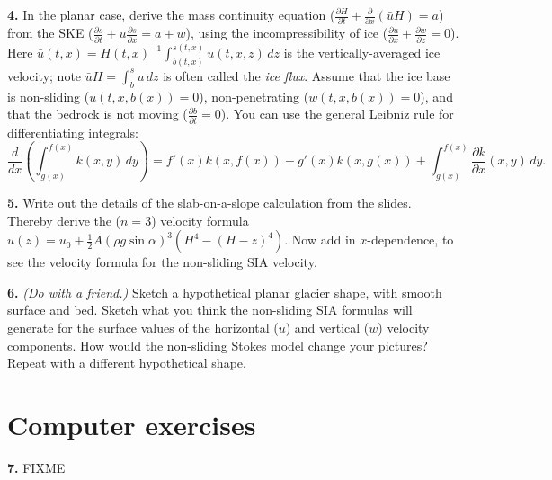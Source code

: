 \documentclass[12pt]{amsart}
\newcommand{\prob}[1]{\bigskip\noindent\textbf{#1.}\quad }
\begin{document}
\prob{4}  In the planar case, derive the mass continuity equation ($\frac{\partial H}{\partial t} + \frac{\partial}{\partial x}(\bar u H) = a$) from the SKE ($\frac{\partial s}{\partial t} + u \frac{\partial s}{\partial x} = a + w$), using the incompressibility of ice ($\frac{\partial u}{\partial x} + \frac{\partial w}{\partial z} = 0$).  Here $\bar u(t,x) = H(t,x)^{-1} \int_{b(t,x)}^{s(t,x)} u(t,x,z)\,dz$ is the vertically-averaged ice velocity; note $\bar u H = \int_b^s u\,dz$ is often called the \emph{ice flux}.  Assume that the ice base is non-sliding ($u(t,x,b(x))=0$), non-penetrating ($w(t,x,b(x))=0$), and that the bedrock is not moving ($\frac{\partial b}{\partial t} = 0$).  You can use the general Leibniz rule for differentiating integrals:
  $$\frac{d}{dx}\left(\int_{g(x)}^{f(x)} k(x,y)\,dy\right) = f'(x) k(x,f(x)) - g'(x) k(x,g(x)) + \int_{g(x)}^{f(x)} \frac{\partial k}{\partial x}(x,y)\,dy.$$

\prob{5}  Write out the details of the slab-on-a-slope calculation from the slides.  Thereby derive the ($n=3$) velocity formula $u(z) = u_0 + \frac{1}{2} A (\rho g \sin\alpha)^3  \left(H^4 - (H-z)^4\right)$.  Now add in $x$-dependence, to see the velocity formula for the non-sliding SIA velocity.

\prob{6}  \emph{(Do with a friend.)}  Sketch a hypothetical planar glacier shape, with smooth surface and bed.  Sketch what you think the non-sliding SIA formulas will generate for the surface values of the horizontal ($u$) and vertical ($w$) velocity components.  How would the non-sliding Stokes model change your pictures?  Repeat with a different hypothetical shape.

\section*{Computer exercises}

\prob{7}  FIXME
\end{document}
